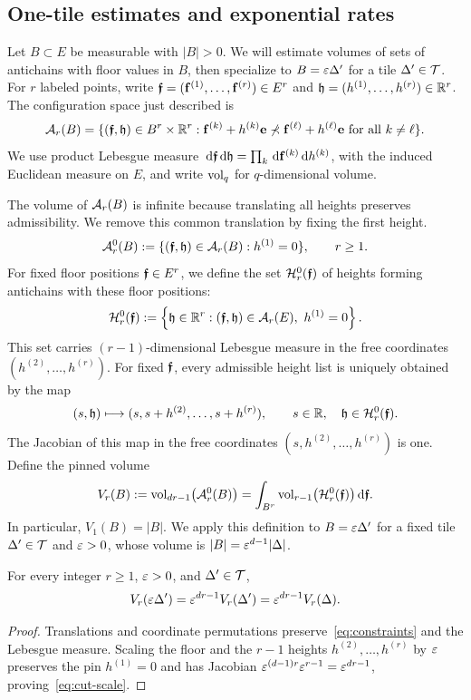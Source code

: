 \documentclass[11pt,letterpaper]{article}
\begin{document}
\subsection{One-tile estimates and exponential rates}
Let $B\subset E$ be measurable with $|B|>0$. We will estimate volumes of sets of antichains with floor values in $B$, then specialize to $B=\varepsilon\Delta'$ for a tile $\Delta'\in\mathcal T$.
For $r$ labeled points, write $\bm{\mathfrak f}=(\mathbf f^{(1)},\ldots,\mathbf f^{(r)})\in E^r$ and $\mathfrak h=(h^{(1)},\ldots,h^{(r)})\in\mathbb R^r$. The configuration space just described is
\begin{equation}\label{eq:A_n_of_B_definition}
      \mathcal A_r(B)=\{(\bm{\mathfrak f},\mathfrak h)\in B^r\times\mathbb R^r:
      \mathbf f^{(k)}+h^{(k)}\mathbf e\not\prec\mathbf f^{(\ell)}+h^{(\ell)}\mathbf e\text{ for all }k\ne\ell\}.
\end{equation}
We use product Lebesgue measure $\,\mathrm d\bm{\mathfrak f}\,\mathrm d\mathfrak h=\prod_k\,\mathrm d\mathbf f^{(k)}\,\mathrm d h^{(k)}$, with the induced Euclidean measure on $E$, and write $\operatorname{vol}_q$ for $q$-dimensional volume.

The volume of $\mathcal A_r(B)$ is infinite because translating all heights preserves admissibility. We remove this common translation by fixing the first height.
\begin{equation}\label{eq:pinned-set}
      \mathcal A_r^0(B):=\{(\bm{\mathfrak f},\mathfrak h)\in\mathcal A_r(B):h^{(1)}=0\},\qquad r\ge1.
\end{equation}
For fixed floor positions $\bm{\mathfrak f}\in E^r$, we define the set $\mathcal H_r^0(\bm{\mathfrak f})$ of heights forming antichains with these floor positions:
\[
      \mathcal H_r^0(\bm{\mathfrak f}):= \left\{\mathfrak h\in\mathbb R^r:(\bm{\mathfrak f},\mathfrak h)\in\mathcal A_r(E),\ h^{(1)}=0\right\}.
\]
This set carries $(r-1)$-dimensional Lebesgue measure in the free coordinates $(h^{(2)},\ldots,h^{(r)})$. For fixed $\bm{\mathfrak f}$, every admissible height list is uniquely obtained by the map
\[
      (s,\mathfrak h)\longmapsto (s,s+h^{(2)},\ldots,s+h^{(r)}), \qquad s\in\mathbb R,\quad\mathfrak h\in\mathcal H_r^0(\bm{\mathfrak f}).
\]
The Jacobian of this map in the free coordinates $(s,h^{(2)},\ldots,h^{(r)})$ is one. Define the pinned volume
\begin{equation}\label{eq:slice}
      V_r(B):=\operatorname{vol}_{dr-1}\bigl(\mathcal A_r^0(B)\bigr)
      =\int_{B^r} \operatorname{vol}_{r-1}\bigl(\mathcal H_r^0(\bm{\mathfrak f})\bigr)\,\mathrm d\bm{\mathfrak f}.
\end{equation}
In particular, $V_1(B)=|B|$. We apply this definition to $B=\varepsilon\Delta'$ for a fixed tile $\Delta'\in \mathcal T$ and $\varepsilon>0$, whose volume is $|B|=\varepsilon^{d-1}|\Delta|$.

\begin{lemma}
      For every integer $r\ge1$, $\varepsilon>0$, and $\Delta'\in\mathcal T$,
      \begin{equation}\label{eq:cut-scale}
            V_r(\varepsilon\Delta') =\varepsilon^{dr-1}V_r(\Delta') =\varepsilon^{dr-1}V_r(\Delta).
      \end{equation}
\end{lemma}
\begin{proof}
      Translations and coordinate permutations preserve~\eqref{eq:constraints} and the Lebesgue measure. Scaling the floor and the $r-1$ heights $h^{(2)},\ldots,h^{(r)}$ by $\varepsilon$ preserves the pin $h^{(1)}=0$ and has Jacobian $\varepsilon^{(d-1)r}\varepsilon^{r-1}=\varepsilon^{dr-1}$, proving~\eqref{eq:cut-scale}.
\end{proof}
\end{document}
